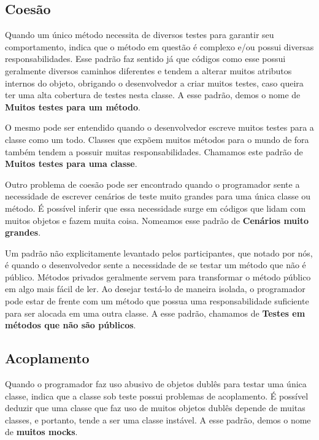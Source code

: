 \subsection{Coesão}

Quando um único método necessita de diversos testes para garantir seu comportamento,
indica que o método em questão é complexo e/ou possui diversas responsabilidades.
Esse padrão faz sentido já que códigos como esse possui geralmente diversos caminhos
diferentes e tendem a alterar muitos atributos internos do objeto, obrigando o desenvolvedor
a criar muitos testes, caso queira ter uma alta cobertura de testes nesta classe.
A esse padrão, demos o nome de \textbf{Muitos testes para um método}.

O mesmo pode ser entendido quando o desenvolvedor escreve muitos testes para a 
classe como um todo. Classes que expõem muitos métodos para o mundo de fora
também tendem a possuir muitas responsabilidades. Chamamos este padrão
de \textbf{Muitos testes para uma classe}.

Outro problema de coesão pode ser encontrado quando o programador
sente a necessidade de escrever cenários de teste muito grandes para uma
única classe ou método. É possível inferir que essa necessidade surge 
em códigos que lidam com muitos objetos e fazem muita coisa. Nomeamos
esse padrão de \textbf{Cenários muito grandes}.

Um padrão não explicitamente levantado pelos participantes, que notado
por nós, é quando o desenvolvedor sente a necessidade de se testar
um método que não é público. Métodos privados geralmente servem para 
transformar o método público em algo mais fácil de ler. Ao desejar
testá-lo de maneira isolada, o programador pode estar de frente com
um método que possua uma responsabilidade suficiente para ser
alocada em uma outra classe. A esse padrão, chamamos de 
\textbf{Testes em métodos que não são públicos}.

\subsection{Acoplamento}

Quando o programador faz uso abusivo de objetos dublês para testar uma
única classe, indica que a classe sob teste possui problemas
de acoplamento. É possível deduzir que uma classe que faz uso de muitos
objetos dublês depende de muitas classes, e portanto, tende a ser
uma classe instável. A esse padrão, demos o nome de \textbf{muitos mocks}.

